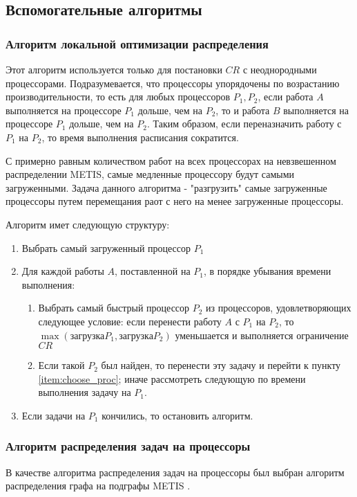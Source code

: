 \subsection{Вспомогательные алгоритмы}

\subsubsection{Алгоритм локальной оптимизации распределения} \label{partition_optimization}

Этот алгоритм используется только для постановки $CR$ с неоднородными процессорами. Подразумевается, что процессоры упорядочены по возрастанию производительности, то есть для любых процессоров $P_1, P_2$, если работа $A$ выполняется на процессоре $P_1$ дольше, чем на $P_2$, то и работа $B$ выполняется на процессоре $P_1$ дольше, чем на $P_2$. Таким образом, если переназначить работу с $P_1$ на $P_2$, то время выполнения расписания сократится.

С примерно равным количеством работ на всех процессорах на невзвешенном распределении METIS, самые медленные процессору будут самыми загруженными. Задача данного алгоритма - "разгрузить" самые загруженные процессоры путем перемещания раот с него на менее загруженные процессоры.

Алгоритм имет следующую структуру:
\begin{enumerate}
    \item Выбрать самый загруженный процессор $P_1$
    \item Для каждой работы $A$, поставленной на $P_1$, в порядке убывания времени выполнения:
          \begin{enumerate}
              \item \label{item:choose_proc} Выбрать самый быстрый процессор $P_2$ из процессоров, удовлетворяющих следующее условие: если перенести работу $A$ с $P_1$ на $P_2$, то $\max(\text{загрузка} P_1, \text{загрузка} P_2)$ уменьшается и выполняется ограничение $CR$
              \item Если такой $P_2$ был найден, то перенести эту задачу и перейти к пункту \ref{item:choose_proc}; иначе рассмотреть следующую по времени выполнения задачу на $P_1$.
          \end{enumerate}
    \item Если задачи на $P_1$ кончились, то остановить алгоритм.
\end{enumerate}

\subsubsection{Алгоритм распределения задач на процессоры} \label{METIS}
В качестве алгоритма распределения задач на процессоры был выбран алгоритм распределения графа на подграфы METIS \cite{Karypis2011}.

